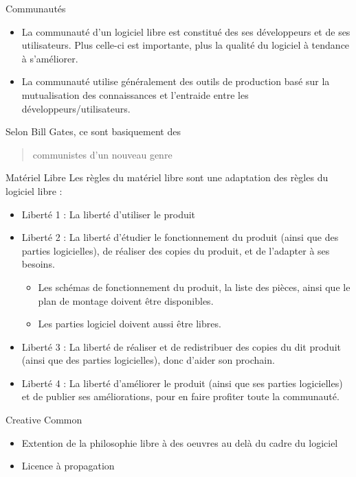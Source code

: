 \documentclass{beamer}
\begin{document}
\begin{frame}{Communautés}
\begin{itemize}
    \item La communauté d'un logiciel libre est constitué des ses développeurs et de ses utilisateurs. Plus celle-ci est importante, plus la qualité du logiciel à tendance à s'améliorer.
    \item La communauté utilise généralement des outils de production basé sur la mutualisation des connaissances et l'entraide entre les développeurs/utilisateurs.
 \end{itemize}
 Selon Bill Gates, ce sont basiquement des \begin{quote}{communistes d'un nouveau genre}\end{quote}
\end{frame}

\begin{frame}{Matériel Libre}
 Les règles du matériel libre sont une adaptation des règles du logiciel libre : 
 \begin{itemize}
    \item Liberté 1 : La liberté d'utiliser le produit
    \item Liberté 2 : La liberté d'étudier le fonctionnement du produit (ainsi que des parties logicielles), de réaliser des copies du produit, et de l'adapter à ses besoins. 
    \begin{itemize}
        \item Les schémas de fonctionnement du produit, la liste des pièces, ainsi que le plan de montage doivent être disponibles.
        \item Les parties logiciel doivent aussi être libres.
    \end{itemize}
    \item Liberté 3 : La liberté de réaliser et de redistribuer des copies du dit produit (ainsi que des parties logicielles), donc d'aider son prochain.
    \item Liberté 4 : La liberté d'améliorer le produit (ainsi que ses parties logicielles) et de publier ses améliorations, pour en faire profiter toute la communauté.
 \end{itemize}

\end{frame}

\begin{frame}{Creative Common}
    \begin{itemize}
        \item Extention de la philosophie libre à des oeuvres au delà du cadre du logiciel
        \item Licence à propagation
    \end{itemize}
\end{frame}
\end{document}
